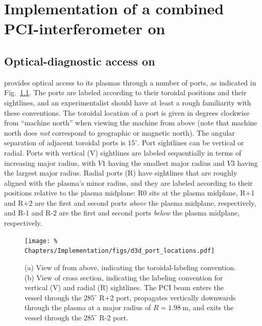 \chapter{Implementation of a combined PCI-interferometer on \diiid}
\label{ch:Implementation}


\section{Optical-diagnostic access on \diiid}
\label{sec:Implementation:d3d_ports}
\diiid \space provides optical access to its plasmas
through a number of ports, as indicated in
Fig.~\ref{fig:Implementation:d3d_port_locations}.
The ports are labeled according to their
toroidal positions and their sightlines, and
an experimentalist should have at least
a rough familiarity with these conventions.
The toroidal location of a port
is given in degrees clockwise from ``machine north''
when viewing the machine from above
(note that machine north does \emph{not} correspond
to geographic or magnetic north).
The angular separation of adjacent toroidal ports is $15^{\circ}$.
Port sightlines can be vertical or radial.
Ports with vertical (V) sightlines
are labeled sequentially in terms of increasing major radius,
with $V1$ having the smallest major radius and
$V3$ having the largest major radius.
Radial ports (R) have sightlines
that are roughly aligned with the plasma's minor radius, and
they are labeled according to their positions
relative to the plasma midplane:
R0 sits at the plasma midplane,
R+1 and R+2 are the first and second ports
\emph{above} the plasma midplane, respectively, and
R-1 and R-2 are the first and second ports
\emph{below} the plasma midplane, respectively.

\begin{figure}
  \centering
  \texttt{[image: \%
    Chapters/Implementation/figs/d3d\_port\_locations.pdf]}
  \caption[\diiid \space port-labeling conventions and location of PCI]{%
    (a) View of \diiid \space from above,
    indicating the toroidal-labeling convention.
    (b) View of \diiid \space cross section,
    indicating the labeling convention
    for vertical (V) and radial (R) sightlines.
    The PCI beam enters the vessel through the $285^{\circ}$ R+2 port,
    propagates vertically downwards through the plasma
    at a major radius of $R = \SI{1.98}{\meter}$, and
    exits the vessel through the $285^{\circ}$ R-2 port.}
\label{fig:Implementation:d3d_port_locations}
\end{figure}



